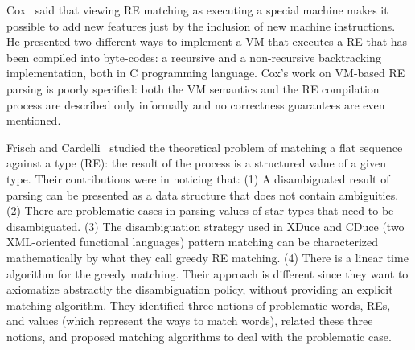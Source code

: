 \documentclass[oneside,12pt]{scrbook}
\theoremstyle{definition}
\theoremstyle{plain}
\theoremstyle{definition}
\begin{document}
Cox~\cite{Cox2009} said that viewing RE matching as executing a special machine makes it possible to add new features just by the inclusion of new machine instructions. He presented two different ways to implement a VM that executes a RE that has been compiled into  byte-codes: a recursive and a non-recursive backtracking implementation, both in C programming language. Cox's work on VM-based RE parsing is poorly specified: both the VM semantics and the RE compilation process are described only informally and no correctness guarantees are even mentioned.



Frisch and Cardelli~\cite{Frisch2004} studied the theoretical problem of matching a flat sequence against a type (RE): the result of the process is a structured value of a given type. Their contributions were in noticing that: (1) A disambiguated result of parsing can be presented as a data structure that does not contain ambiguities. (2) There are problematic cases in parsing values of star types that need to be disambiguated. (3) The disambiguation strategy used in XDuce and CDuce (two XML-oriented functional languages) pattern matching can be characterized mathematically by what they call greedy RE matching. (4) There is a linear time algorithm for the greedy matching. Their approach is different since they want to axiomatize abstractly the disambiguation policy, without providing an explicit matching algorithm. They identified three notions of problematic words, REs, and values (which represent the ways to match words), related these three notions, and proposed matching algorithms to deal with the problematic case.
\end{document}
